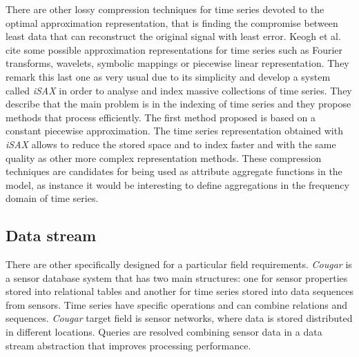 There are other lossy compression techniques for time series devoted
to the optimal approximation representation, that is finding the
compromise between least data that can reconstruct the original signal
with least error. Keogh et al.\ \cite{keogh01} cite some possible
approximation representations for time series such as Fourier
transforms, wavelets, symbolic mappings or piecewise linear
representation. They remark this last one as very usual due to its
simplicity and develop a system called \emph{iSAX}
\cite{keogh08:isax,keogh10:isax} in order to analyse and index massive
collections of time series. They describe that the main problem is in
the indexing of time series and they propose methods that process
efficiently. The first method proposed is based on a constant
piecewise approximation. The time series representation obtained with
\emph{iSAX} allows to reduce the stored space and to index faster and
with the same quality as other more complex representation methods.
These compression techniques  are candidates for being used as
attribute aggregate functions in the  model, as instance it
would be interesting to define aggregations in the frequency domain of
time series.


 



 


\subsection{Data stream}



There are other  specifically designed for a particular
field requirements.  \emph{Cougar} \cite{bonnet01} is a sensor
database system that has two main structures: one for sensor
properties stored into relational tables and another for time series
stored into data sequences from sensors. Time series have specific
operations and can combine relations and sequences. \emph{Cougar}
target field is sensor networks, where data is stored distributed in
different locations. Queries are resolved combining sensor data in a
data stream abstraction that improves processing performance.

